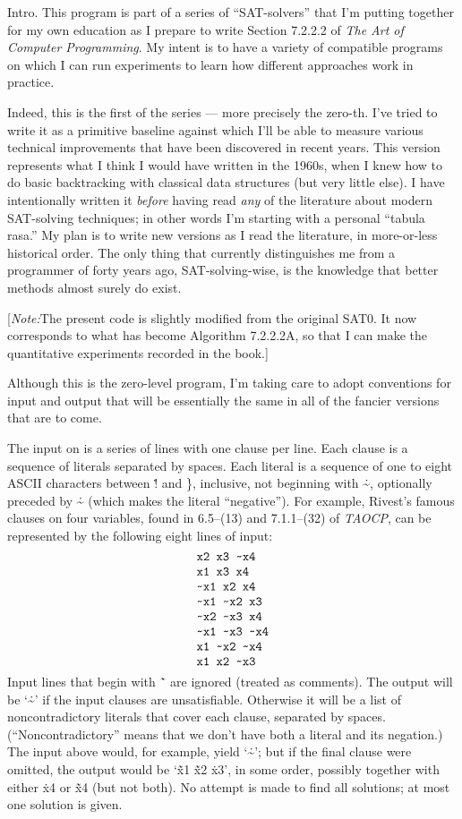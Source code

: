 
\datethis

Intro. This program is part of a series of ``SAT-solvers'' that I'm
putting
together for my own education as I prepare to write Section 7.2.2.2 of
{\sl The Art of Computer Programming}. My intent is to have a variety of
compatible programs on which I can run experiments to learn how different
approaches work in practice.

Indeed, this is the first of the series --- more precisely the zero-th. I've
tried to write it as a primitive baseline against which I'll be able to measure
various technical improvements that have been discovered in recent years.
This version represents what I think I would have written in the 1960s,
when I knew how to do basic backtracking with classical data structures
(but very little else). I have intentionally written it {\it before\/} having
read {\it any\/} of the literature about modern SAT-solving techniques;
in other words I'm starting with a personal ``tabula rasa.''
My plan is to write new versions as I read the literature, in more-or-less
historical order. The only thing that currently distinguishes me from a
programmer of forty years ago, SAT-solving-wise, is the knowledge that better
methods almost surely do exist.

[{\it Note:}\enspace The present code is slightly modified from the
original {\mc SAT0}. It now corresponds to what has become
Algorithm 7.2.2.2A, so that I can make the quantitative experiments
recorded in the book.]

Although this is the zero-level program, I'm taking care to adopt conventions
for input and output that will be essentially the same in all of the
fancier versions that are to come.

The input on  is a series of lines with one clause per line. Each
clause is a sequence of literals separated by spaces. Each literal is
a sequence of one to eight ASCII characters between \.{!} and \.{\}},
inclusive, not beginning with \.{\~},
optionally preceded by \.{\~} (which makes the literal ``negative'').
For example, Rivest's famous clauses on four variables,
found in 6.5--(13) and 7.1.1--(32) of {\sl TAOCP}, can be represented by the
following eight lines of input:
$$\chardef~=`\~
\vcenter{\halign{\tt#\cr
x2 x3 ~x4\cr
x1 x3 x4\cr
~x1 x2 x4\cr
~x1 ~x2 x3\cr
~x2 ~x3 x4\cr
~x1 ~x3 ~x4\cr
x1 ~x2 ~x4\cr
x1 x2 ~x3\cr}}$$
Input lines that begin with \.{\~\ } are ignored (treated as comments).
The output will be `\.{\~}' if the input clauses are unsatisfiable.
Otherwise it will be a list of noncontradictory literals that cover each
clause, separated by spaces. (``Noncontradictory'' means that we don't
have both a literal and its negation.) The input above would, for example,
yield `\.{\~}'; but if the final clause were omitted, the output would
be `\.{\~x1} \.{\~x2} \.{x3}', in some order, possibly together
with either \.{x4} or \.{\~x4} (but not both). No attempt is made to
find all solutions; at most one solution is given.

